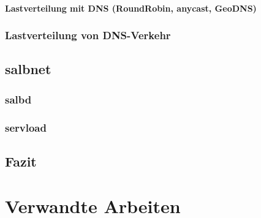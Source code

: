 \documentclass[a4paper, 11pt, toc=bibliography, toc=listof]{scrbook}
\begin{document}
				\subsubsection{Lastverteilung mit DNS (RoundRobin, anycast, GeoDNS)} %
				\label{ssub:Lastverteilung mit DNS (RoundRobin, anycast, GeoDNS)}
				

			
			\subsection{Lastverteilung von DNS-Verkehr} %
			\label{sub:Lastverteilung von DNS-Verkehr}
			


		\section{salbnet} %
		\label{sec:salbnet}
			
			\subsection{salbd} %
			\label{sub:salbd}
				

			\subsection{servload} %
			\label{sub:servload}
				


		\section{Fazit} %
		\label{sec:Fazit}
		


	\chapter{Verwandte Arbeiten} %
	\label{cha:Verwandte Arbeiten}
\end{document}
